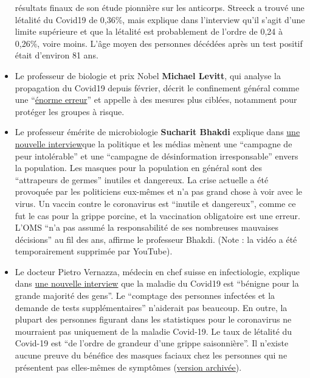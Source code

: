 \begin{itemize}
  résultats finaux de son étude pionnière sur les anticorps. Streeck a
  trouvé une létalité du Covid19 de 0,36\%, mais explique dans
  l'interview qu'il s'agit d'une limite supérieure et que la létalité
  est probablement de l'ordre de 0,24 à 0,26\%, voire moins. L'âge moyen
  des personnes décédées après un test positif était d'environ 81 ans.
\item
  Le professeur de biologie et prix Nobel \textbf{Michael Levitt}, qui
  analyse la propagation du Covid19 depuis février, décrit le
  confinement général comme une
  ``\href{https://www.youtube.com/watch?v=bl-sZdfLcEk}{énorme erreur}''
  et appelle à des mesures plus ciblées, notamment pour protéger les
  groupes à risque.
\item
  Le professeur émérite de microbiologie \textbf{Sucharit Bhakdi}
  explique dans
  \href{https://www.servustv.com/videos/aa-23zjmvcz51w12/}{une nouvelle
  interview}que la politique et les médias mènent une ``campagne de peur
  intolérable'' et une ``campagne de désinformation irresponsable''
  envers la population. Les masques pour la population en général sont
  des ``attrapeurs de germes'' inutiles et dangereux. La crise actuelle
  a été provoquée par les politiciens eux-mêmes et n'a pas grand chose à
  voir avec le virus. Un vaccin contre le coronavirus est ``inutile et
  dangereux'', comme ce fut le cas pour la grippe porcine, et la
  vaccination obligatoire est une erreur. L'OMS ``n'a pas assumé la
  responsabilité de ses nombreuses mauvaises décisions'' au fil des ans,
  affirme le professeur Bhakdi. (Note : la vidéo a été temporairement
  supprimée par YouTube).
\item
  Le docteur Pietro Vernazza, médecin en chef suisse en infectiologie,
  explique dans
  \href{https://www.saldo.ch/artikel/artikeldetail/fuer-die-allermeisten-menschen-verlaeuft-die-erkrankung-mild/}{une
  nouvelle interview} que la maladie du Covid19 est ``bénigne pour la
  grande majorité des gens''. Le ``comptage des personnes infectées et
  la demande de tests supplémentaires'' n'aiderait pas beaucoup. En
  outre, la plupart des personnes figurant dans les statistiques pour le
  coronavirus ne mourraient pas uniquement de la maladie Covid-19. Le
  taux de létalité du Covid-19 est ``de l'ordre de grandeur d'une grippe
  saisonnière''. Il n'existe aucune preuve du bénéfice des masques
  faciaux chez les personnes qui ne présentent pas elles-mêmes de
  symptômes
  (\href{https://swprs.files.wordpress.com/2020/05/saldo-interview-pietro-vernazza-14-04-2020.pdf}{version
  archivée}).
\end{itemize}

